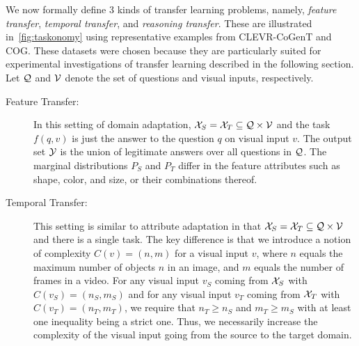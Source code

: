We now formally define 3 kinds of transfer learning problems, namely,
\emph{feature transfer}, \emph{temporal transfer},
and \emph{reasoning transfer}.
These are illustrated in~\cref{fig:taskonomy} using representative examples from CLEVR-CoGenT and COG. These datasets were chosen because they
are particularly suited for experimental investigations of transfer learning described in the following section.
Let $\mathcal{Q}$ and $\mathcal{V}$ denote the set of questions and visual inputs, respectively.
\begin{description}
	\item[Feature Transfer:] In this setting of domain adaptation, $\mathcal{X}_S = \mathcal{X}_T \subseteq \mathcal{Q} \times \mathcal{V}$
	and the task $f(q,v)$ is just the answer to the question $q$ on visual input $v$. The output set $\mathcal{Y}$ is the union of legitimate answers
	over all questions in $\mathcal{Q}$.
	The marginal distributions $P_S$ and $P_T$ differ in the feature attributes such as shape, color, and size, or their combinations
	thereof.

	\item[Temporal Transfer:] This setting is similar to attribute adaptation in that $\mathcal{X}_S = \mathcal{X}_T \subseteq \mathcal{Q} \times \mathcal{V}$
	and there is a single task.
	The key difference is that we introduce a notion of complexity $C(v) = (n, m)$ for a visual input $v$,
	where $n$ equals the maximum number of objects $n$ in an image, and $m$
	equals  the number of frames in a video.
	For any visual input $v_S$ coming from $\mathcal{X}_S$ with $C(v_S) = (n_S, m_S)$
	and for any visual input $v_T$ coming from $\mathcal{X}_T$ with $C(v_T) = (n_T, m_T)$, we require that $n_T \ge n_S$ and
	$m_T \ge m_S$ with at least one inequality being a strict one.
	Thus, we necessarily increase the complexity of the visual input going from the source to the target domain.


\end{description}

